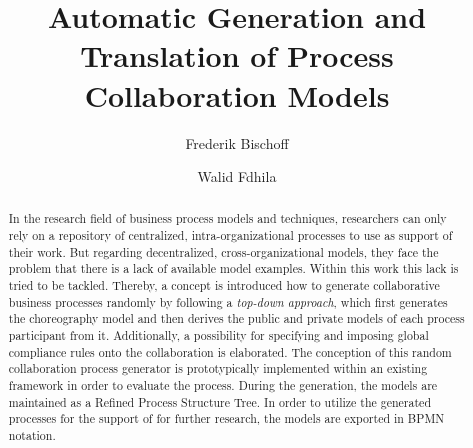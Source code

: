 \documentclass[runningheads]{llncs}
\begin{document}
%
\title{Automatic Generation and Translation of Process Collaboration Models}
%
%
\author{Frederik Bischoff \and Walid Fdhila}

%
%
%
\maketitle              %
%
\begin{abstract}
In the research field of business process models and techniques, researchers can only rely on a repository of centralized, intra-organizational processes to use as support of their work. But regarding decentralized, cross-organizational models, they face the problem that there is a lack of available model examples. Within this work this lack is tried to be tackled. Thereby, a concept is introduced how to generate collaborative business processes randomly by following a \textit{top-down approach}, which first generates the choreography model and then derives the public and private models of each process participant from it. Additionally, a possibility for specifying and imposing global compliance rules onto the collaboration is elaborated. The conception of this random collaboration process generator is prototypically implemented within an existing framework in order to evaluate the process. During the generation, the models are maintained as a Refined Process Structure Tree. In order to utilize the generated processes for the support of for further research, the models are exported in BPMN notation.  

\end{abstract}
%
%
%
\end{document}
